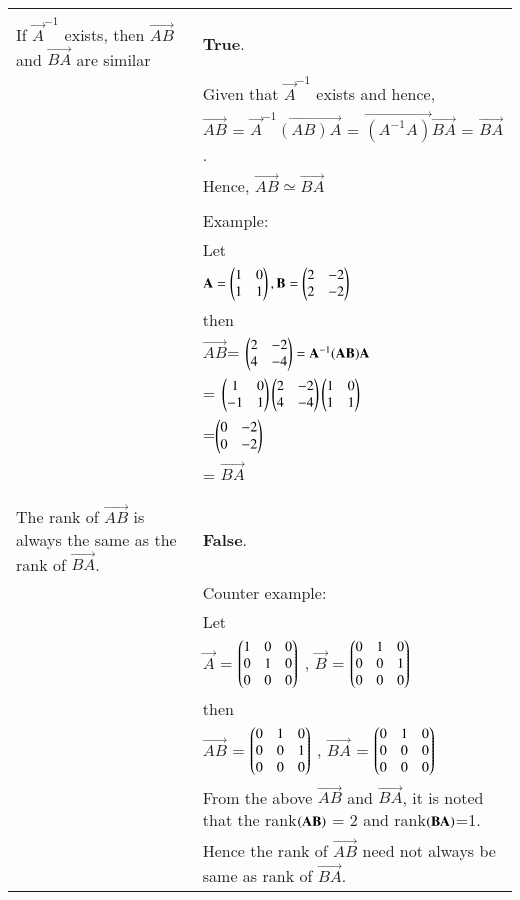 \begin{table*}[h]
	\begin{tabular}{|m{3cm}|m{14cm}|}
		\hline
		&\\
	    If $\vec{A}^{-1}$ exists, then $\vec{AB}$ and $\vec{BA}$ are similar
		& \textbf{True}. \\
		& Given that $\vec{A}^{-1}$ exists and hence,\\
		&\qquad\qquad\qquad $\vec{AB}$ = $\vec{A}^{-1}\vec{(AB)A}$ =  $\vec{(A^{-1}A)}\vec{BA}$ = $\vec{BA}$.\\
		& Hence, $\vec{AB} \simeq \vec{BA}$ \\
		&\\
		&Example:\\
		& Let\\
		& \qquad\qquad\qquad$\mathbf{A} = \begin{pmatrix}1 & 0 \\ 1 & 1\end{pmatrix}, \mathbf{B} = \begin{pmatrix}2 & -2 \\ 2 & -2\end{pmatrix}$\\
		&then\\
		& \qquad\qquad\qquad$\vec{AB}$\quad= $\begin{pmatrix}2 & -2 \\ 4 & -4\end{pmatrix} = \mathbf{A}^{-1} (\mathbf{AB})\mathbf{A}$\\
		&  \qquad\qquad\qquad  \qquad\qquad\qquad\quad= $\begin{pmatrix}1 & 0\\ -1 & 1\end{pmatrix}\begin{pmatrix}2 & -2 \\ 4 & -4\end{pmatrix}\begin{pmatrix}1 & 0 \\ 1 & 1\end{pmatrix}$\\
		&  \qquad\qquad\qquad \qquad\qquad\qquad\quad=$\begin{pmatrix}0 & -2 \\ 0 & -2\end{pmatrix} $\\
		&  \qquad\qquad\qquad \qquad\qquad\qquad\quad= $\vec{BA}$\\
		&\\
		\hline
		&\\
	    The rank of $\vec{AB}$  is always the same as the rank of $\vec{BA}$.
		& \textbf{False}. \\
		&Counter example:\\
		& Let\\
		& \qquad\qquad\qquad$\vec{A}$ = $\begin{pmatrix}1 & 0 & 0 \\ 0 &1 & 0\\ 0 & 0 & 0\end{pmatrix}$ , 
		$\vec{B}$ = $\begin{pmatrix}0& 1 & 0 \\ 0 & 0 & 1\\ 0 & 0 & 0\end{pmatrix}$\\
		&then\\
		& \qquad\qquad\qquad$\vec{AB}$ = $\begin{pmatrix}0 & 1 & 0 \\ 0 & 0 & 1\\ 0 & 0 & 0\end{pmatrix}$ ,  $\vec{BA}$ = $\begin{pmatrix}0 & 1  & 0\\ 0 & 0 & 0\\ 0 & 0 & 0\end{pmatrix}$\\
		& From the above $\vec{AB}$ and $\vec{BA}$, it is noted that the rank$\left(\mathbf{AB}\right)$ = 2 and rank$\left(\mathbf{BA}\right)$=1. \\
		& Hence the rank of $\vec{AB}$ need not always be same as rank of $\vec{BA}$.
		\\
		\hline
	\end{tabular}
\caption{}
\label{eq:solutions/2015/dec/75/tab:2}
\end{table*}

